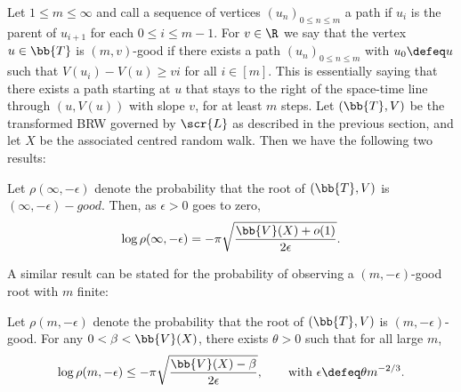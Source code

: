 Let $1 \leq m \leq \infty$ and call a sequence of vertices $(u_n)_{0 \leq n \leq m}$ a path if $u_i$ is the parent of $u_{i+1}$ for each $0 \leq i \leq m-1$. For $v \in \R$ we say that the vertex $u \in \bb{T}$ is $(m, v)$-good if there exists a path $(u_n)_{0 \leq n \leq m}$ with $u_0 \defeq u$ such that $V(u_i) - V(u) \geq vi$ for all $i \in [m]$. This is essentially saying that there exists a path starting at $u$ that stays to the right of the space-time line through $(u, V(u))$ with slope $v$, for at least $m$ steps. Let $(\bb{T}, V)$ be the transformed BRW governed by $\scr{L}$ as described in the previous section, and let $X$ be the associated centred random walk. Then we have the following two results: \\

\begin{theorem}\label{thm:infty_good}
Let $\rho(\infty, - \epsilon)$ denote the probability that the root of $(\bb{T}, V)$ is $(\infty, - \epsilon)-good$. Then, as $\epsilon > 0$ goes to zero, 
\begin{equation}
\log\rho(\infty, - \epsilon) = - \pi \sqrt{\frac{\bb{V}(X) + o(1)}{2 \epsilon}}. 
\end{equation}
\end{theorem}

A similar result can be stated for the probability of observing a $(m, - \epsilon)$-good root with $m$ finite:
\begin{theorem}\label{thm:finite_good}
Let $\rho(m, - \epsilon)$ denote the probability that the root of $(\bb{T}, V)$ is $(m, - \epsilon)$-good. For any $0 < \beta < \bb{V}(X)$, there exists $\theta > 0$ such that for all large $m$, 
\begin{equation*}
\log \rho(m, - \epsilon) \leq - \pi \sqrt{\frac{\bb{V}(X) - \beta}{2 \epsilon}}, \qquad \text{with } \epsilon \defeq \theta m^{-2/3}. 
\end{equation*}
\end{theorem}